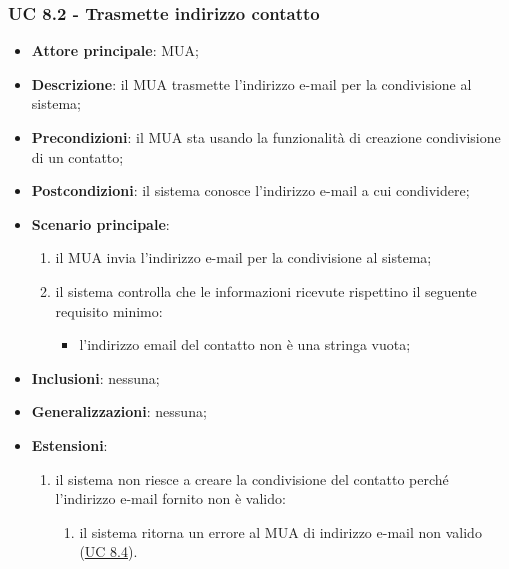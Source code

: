     \subsubsection{UC 8.2 - Trasmette indirizzo contatto} \label{sec:UC8.2}
    \begin{itemize}
        \item \textbf{Attore principale}: MUA;
        \item \textbf{Descrizione}: il MUA trasmette l'indirizzo e-mail per la condivisione al sistema;
        \item \textbf{Precondizioni}: il MUA sta usando la funzionalità di creazione condivisione di un contatto;
        \item \textbf{Postcondizioni}: il sistema conosce l'indirizzo e-mail a cui condividere;
        \item \textbf{Scenario principale}:
            \begin{enumerate}
                \item il MUA invia l'indirizzo e-mail per la condivisione al sistema;
                \item il sistema controlla che le informazioni ricevute rispettino il seguente requisito minimo:
                    \begin{itemize}
                        \item l'indirizzo email del contatto non è una stringa vuota;
                    \end{itemize}
            \end{enumerate}
        \item \textbf{Inclusioni}: nessuna;
        \item \textbf{Generalizzazioni}: nessuna;
        \item \textbf{Estensioni}:
            \begin{enumerate}[label=\alph*.]
                \item il sistema non riesce a creare la condivisione del contatto perché l'indirizzo e-mail fornito non è valido:
                \begin{enumerate}[label=\arabic*.]
                    \item il sistema ritorna un errore al MUA di indirizzo e-mail non valido (\hyperref[sec:UC8.4]{UC 8.4}).
                \end{enumerate}
            \end{enumerate}
    \end{itemize}


